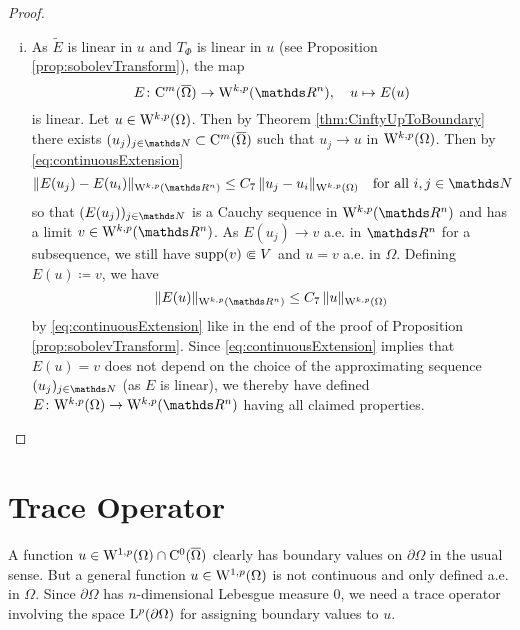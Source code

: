 \begin{proof}
\begin{enumerate}[i)]
      \item As $\tilde E$ is linear in $u$ and $T_\Phi$ is linear in $u$ (see Proposition \ref{prop:sobolevTransform}), the map
        $$
        E \colon \CC^m(\overline\Omega) \to \WW^{k,p}(\R^n), \quad u \mapsto E(u)
        $$
        is linear.
        Let $u \in \mathrm{W}^{k,p}(\Omega)$.
        Then by Theorem \ref{thm:CinftyUpToBoundary} there exists $(u_j)_{j\in \N} \subset \CC^m(\overline\Omega)$ such that $u_j \to u$ in $\mathrm{W}^{k,p}(\Omega)$.
        Then by \eqref{eq:continuousExtension}
        $$
        \|E(u_j) - E(u_i) \|_{\WW^{k,p}(\R^n)} \leq C_7 \, \|u_j - u_i \|_{\WW^{k,p}(\Omega)} \quad\text{for all } i,j \in \N
        $$
        so that $(E(u_j))_{j \in \N}$ is a Cauchy sequence in $\WW^{k,p}(\R^n)$ and has a limit $v \in \WW^{k,p}(\R^n)$.
        As $E(u_j) \to v$ a.e. in $\R^n$ for a subsequence, we still have $\operatorname{supp}(v) \Subset V$ and $u = v$ a.e. in $\Omega$.
        Defining $E(u) \coloneqq v$, we have
        $$
        \|E(u)\|_{\WW^{k,p}(\R^n)} \leq C_7 \, \|u\|_{\WW^{k,p}(\Omega)}
        $$
        by \eqref{eq:continuousExtension} like in the end of the proof of Proposition \ref{prop:sobolevTransform}. 
        Since \eqref{eq:continuousExtension} implies that $E(u) = v$ does not depend on the choice of the approximating sequence $(u_j)_{j \in \N}$ (as $E$ is linear), we thereby have defined $E \colon \WW^{k,p}(\Omega) \to \WW^{k,p}(\R^n)$ having all claimed properties. \qedhere
  \end{enumerate}
\end{proof}

\section{Trace Operator}

A function $u \in \mathrm{W}^{1,p}(\Omega) \cap \mathrm{C}^0(\overline\Omega)$ clearly has boundary values on $\partial\Omega$ in the usual sense.
But a general function $u \in \mathrm{W}^{1,p}(\Omega)$ is not continuous and only defined a.e. in $\Omega$. 
Since $\partial\Omega$ has $n$-dimensional Lebesgue measure $0$, we need a trace operator involving the space $\mathrm{L}^p(\partial\Omega)$ for assigning boundary values to $u$.

